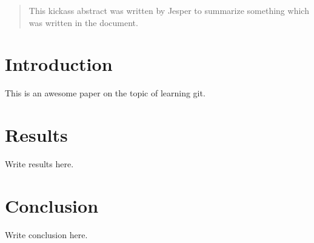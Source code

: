 \documentclass{article}
\begin{document}
\begin{abstract}
This kickass abstract was written by Jesper to summarize something which was written in the document.
\end{abstract}

\section{Introduction}

This is an awesome paper on the topic of learning git.

\section{Results}

Write results here.

\section{Conclusion}

Write conclusion here.
\end{document}
